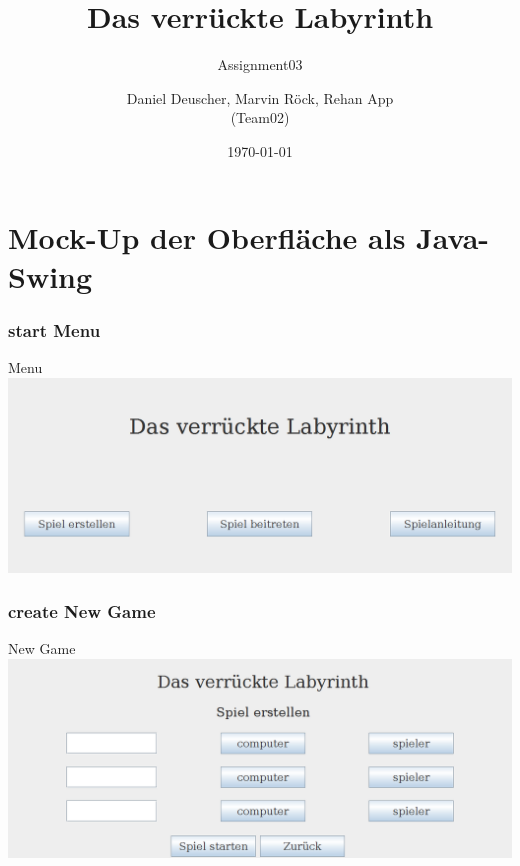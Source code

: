 \documentclass{beamer}
\begin{document}
	\title[]{Das verrückte Labyrinth}	
	\subtitle{Assignment03}
	\author{Daniel Deuscher, Marvin Röck, Rehan App\\ (Team02)}
	\date{\today}
	 
	\begin{frame}
		\maketitle
	\end{frame}
	
		\section{Mock-Up der Oberfläche als Java-Swing}
		    \label{Frame1}	
			\begin{frame}
				\frametitle{start Menu}
				\begin{block}{Menu}
					\includegraphics[scale=0.25]{Bilder/bild1.png}
				\end{block}		
			\end{frame}
		    \label{Frame2}	
			\begin{frame}
				\frametitle{create New Game}
				\begin{block}{New Game}
					\includegraphics[scale=0.25]{Bilder/bild2.png}
				\end{block}		
			\end{frame}
\end{document}
